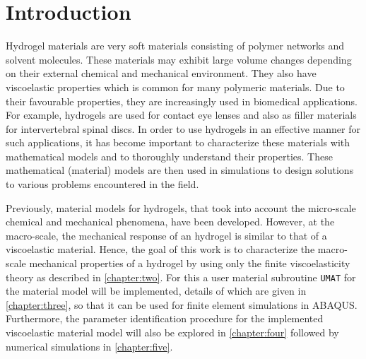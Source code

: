 \chapter{Introduction}

Hydrogel materials are very soft materials consisting of polymer networks and solvent molecules. These materials may exhibit large volume changes depending on their external chemical and mechanical environment. They also have viscoelastic properties which is common for many polymeric materials. Due to their favourable properties, they are increasingly used in biomedical applications. For example, hydrogels are used for contact eye lenses and also as filler materials for intervertebral spinal discs. In order to use hydrogels in an effective manner for such applications, it has become important to characterize these materials with mathematical models and to thoroughly understand their properties. These mathematical (material) models are then used in simulations to design solutions to various problems encountered in the field. 

Previously, material models for hydrogels, that took into account the micro-scale chemical and mechanical phenomena, have been developed\cite{Long2014Oct}. However, at the macro-scale, the mechanical response of an hydrogel is similar to that of a viscoelastic material. Hence, the goal of this work is to characterize the macro-scale mechanical properties of a hydrogel by using only the finite viscoelasticity theory as described in \cref{chapter:two}. For this a user material subroutine \texttt{UMAT} for the material model will be implemented, details of which are given in \cref{chapter:three}, so that it can be used for finite element simulations in ABAQUS. Furthermore, the parameter identification procedure for the implemented viscoelastic material model will also be explored in \cref{chapter:four} followed by numerical simulations in \cref{chapter:five}. 




